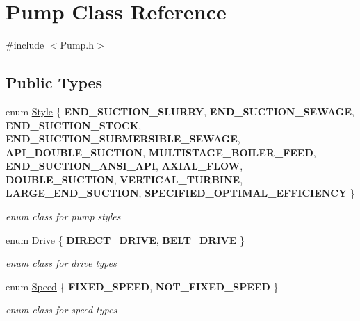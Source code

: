 \hypertarget{class_pump}{}\section{Pump Class Reference}
\label{class_pump}


{\ttfamily \#include $<$Pump.\+h$>$}

\subsection*{Public Types}
\begin{DoxyCompactItemize}
\item 
\mbox{\label{class_pump_aef354601ce4218258cc898b35a1e90ff}} 
enum \hyperlink{class_pump_aef354601ce4218258cc898b35a1e90ff}{Style} \{ \newline
{\bfseries E\+N\+D\+\_\+\+S\+U\+C\+T\+I\+O\+N\+\_\+\+S\+L\+U\+R\+RY}, 
{\bfseries E\+N\+D\+\_\+\+S\+U\+C\+T\+I\+O\+N\+\_\+\+S\+E\+W\+A\+GE}, 
{\bfseries E\+N\+D\+\_\+\+S\+U\+C\+T\+I\+O\+N\+\_\+\+S\+T\+O\+CK}, 
{\bfseries E\+N\+D\+\_\+\+S\+U\+C\+T\+I\+O\+N\+\_\+\+S\+U\+B\+M\+E\+R\+S\+I\+B\+L\+E\+\_\+\+S\+E\+W\+A\+GE}, 
\newline
{\bfseries A\+P\+I\+\_\+\+D\+O\+U\+B\+L\+E\+\_\+\+S\+U\+C\+T\+I\+ON}, 
{\bfseries M\+U\+L\+T\+I\+S\+T\+A\+G\+E\+\_\+\+B\+O\+I\+L\+E\+R\+\_\+\+F\+E\+ED}, 
{\bfseries E\+N\+D\+\_\+\+S\+U\+C\+T\+I\+O\+N\+\_\+\+A\+N\+S\+I\+\_\+\+A\+PI}, 
{\bfseries A\+X\+I\+A\+L\+\_\+\+F\+L\+OW}, 
\newline
{\bfseries D\+O\+U\+B\+L\+E\+\_\+\+S\+U\+C\+T\+I\+ON}, 
{\bfseries V\+E\+R\+T\+I\+C\+A\+L\+\_\+\+T\+U\+R\+B\+I\+NE}, 
{\bfseries L\+A\+R\+G\+E\+\_\+\+E\+N\+D\+\_\+\+S\+U\+C\+T\+I\+ON}, 
{\bfseries S\+P\+E\+C\+I\+F\+I\+E\+D\+\_\+\+O\+P\+T\+I\+M\+A\+L\+\_\+\+E\+F\+F\+I\+C\+I\+E\+N\+CY}
 \}\begin{DoxyCompactList}\small\item\em enum class for pump styles \end{DoxyCompactList}
\item 
\mbox{\label{class_pump_a32bf0ade131a11bb3b3fb374f638e983}} 
enum \hyperlink{class_pump_a32bf0ade131a11bb3b3fb374f638e983}{Drive} \{ {\bfseries D\+I\+R\+E\+C\+T\+\_\+\+D\+R\+I\+VE}, 
{\bfseries B\+E\+L\+T\+\_\+\+D\+R\+I\+VE}
 \}\begin{DoxyCompactList}\small\item\em enum class for drive types \end{DoxyCompactList}
\item 
\mbox{\label{class_pump_ae443603074ebca82f0b89209482d10b6}} 
enum \hyperlink{class_pump_ae443603074ebca82f0b89209482d10b6}{Speed} \{ {\bfseries F\+I\+X\+E\+D\+\_\+\+S\+P\+E\+ED}, 
{\bfseries N\+O\+T\+\_\+\+F\+I\+X\+E\+D\+\_\+\+S\+P\+E\+ED}
 \}\begin{DoxyCompactList}\small\item\em enum class for speed types \end{DoxyCompactList}
\end{DoxyCompactItemize}
